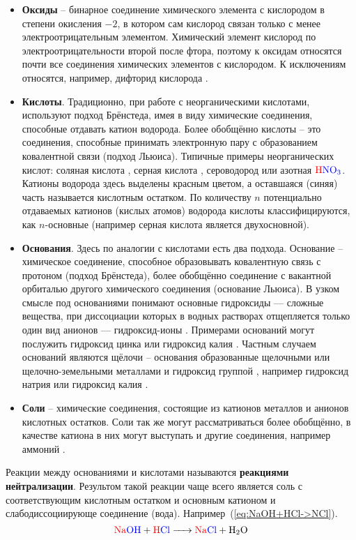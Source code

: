 \begin{itemize}
    \item \textbf{Оксиды} --  бинарное соединение химического элемента с кислородом в степени окисления $-2$, в котором сам кислород связан только с менее электроотрицательным элементом. Химический элемент кислород по электроотрицательности второй после фтора, поэтому к оксидам относятся почти все соединения химических элементов с кислородом. К исключениям относятся, например, дифторид кислорода .
    \item \textbf{Кислоты}. Традиционно, при работе с неорганическими кислотами, используют подход Брёнстеда, имея в виду химические соединения, способные отдавать катион водорода. Более обобщённо кислоты -- это соединения, способные принимать электронную пару с образованием ковалентной связи (подход Льюиса). Типичные примеры неорганических кислот: соляная кислота , серная кислота , сероводород  или азотная $\color{red}\mathrm{H}\color{blue}\mathrm{NO}_{3}$. Катионы водорода здесь выделены красным цветом, а оставшаяся (синяя) часть называется кислотным остатком. По количеству $n$ потенциально отдаваемых катионов (кислых атомов) водорода кислоты классифицируются, как $n$-основные (например серная кислота является двухосновной). 
    \item \textbf{Основания}. Здесь по аналогии с кислотами есть два подхода. Основание -- химическое соединение, способное образовывать ковалентную связь с протоном (подход Брёнстеда), более обобщённо соединение с вакантной орбиталью другого химического соединения (основание Льюиса). В узком смысле под основаниями понимают основные гидроксиды — сложные вещества, при диссоциации которых в водных растворах отщепляется только один вид анионов — гидроксид-ионы . Примерами оснований могут послужить гидроксид цинка  или гидроксид калия . Частным случаем оснований являются щёлочи -- основания образованные щелочными или щелочно-земельными металлами и гидроксид группой , например гидроксид натрия  или гидроксид калия .
    \item \textbf{Соли} -- химические соединения, состоящие из катионов металлов и анионов кислотных остатков. Соли так же могут рассматриваться более обобщённо, в качестве катиона в них могут выступать и другие соединения, например аммоний .
\end{itemize}
Реакции между основаниями и кислотами называются \textbf{реакциями нейтрализации}. Результом такой реакции чаще всего является соль с соответствующим кислотным остатком и основным катионом и слабодиссоциирующе соединение (вода). Например~(\ref{eq:NaOH+HCl->NCl}).
\begin{equation}
\label{eq:NaOH+HCl->NCl}
    \ce{\color{red}Na\color{blue}OH  + \color{red}H\color{blue}Cl -> \color{red}Na\color{blue}Cl}  + \ce{H2O}
\end{equation}
